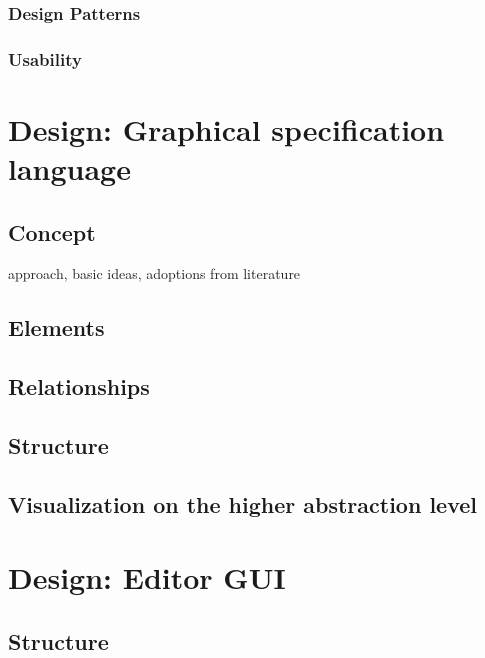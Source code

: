\documentclass[twoside, openright, 12pt]{book}
\begin{document}
\subsection{Design Patterns}
\label{design_patterns}


\subsection{Usability}
\label{usability}




\cleardoublepage
\chapter{Design: Graphical specification language}
\label{gsl_design}


\section{Concept}
\label{gsl_concept}
approach, basic ideas, adoptions from literature

\section{Elements}
\label{gsl_elements}


\section{Relationships}
\label{gsl_relationships}


\section{Structure}
\label{gsl_structure}


\section{Visualization on the higher abstraction level}
\label{higher_abstraction_level}




\cleardoublepage
\chapter{Design: Editor GUI}
\label{editor_design}


\section{Structure}
\label{editor_structure}
\end{document}
